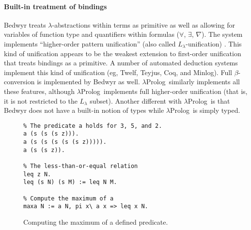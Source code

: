 \documentclass{article}
\newcommand{\lp}{$\lambda$Prolog}
\begin{document}
\paragraph{Built-in treatment of bindings}
Bedwyr treats $\lambda$-abstractions within terms as primitive as well
as allowing for variables of function type and quantifiers within
formulas ($\forall$, $\exists$, $\nabla$).  The system
implements ``higher-order pattern unification'' (also called
$L_\lambda$-unification) \cite{miller91jlc}.   This kind of unification
appears to be the weakest extension to first-order unification that
treats bindings as a primitive.  A number of automated deduction systems
implement this kind of unification (eg, Twelf, Teyjus, Coq, and
Minlog).  Full $\beta$-conversion is implemented by Bedwyr as well.
\lp\ similarly implements all these features, although \lp\ implements
full higher-order unification (that is, it is not restricted to the
$L_\lambda$ subset).  Another different with \lp\ is that Bedwyr does
not have a built-in notion of types while \lp\ is simply typed.

\begin{figure}
\begin{verbatim}
% The predicate a holds for 3, 5, and 2.
a (s (s (s z))).
a (s (s (s (s (s z))))).
a (s (s z)).

% The less-than-or-equal relation
leq z N.
leq (s N) (s M) := leq N M.

% Compute the maximum of a
maxa N := a N, pi x\ a x => leq x N.
\end{verbatim}
\caption{Computing the maximum of a defined predicate.}
\label{maxa}
\end{figure}
\end{document}
